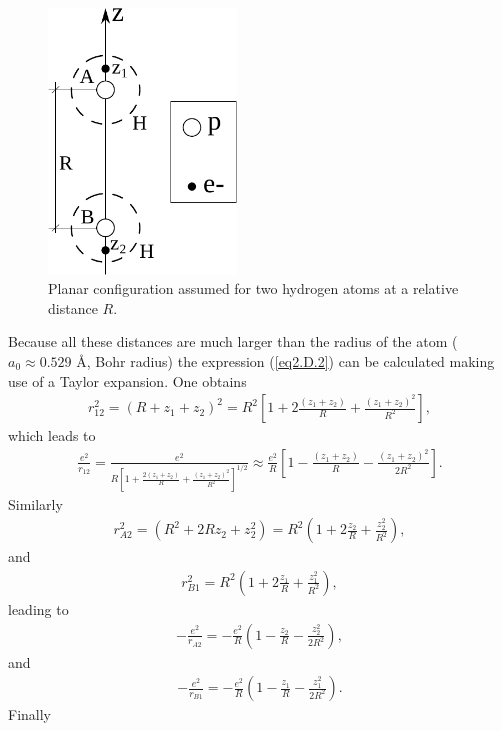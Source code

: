 \begin{subappendices}
    \begin{figure}
     \centerline{\includegraphics*[width=5cm,angle=0]{nutshell/figs/fig2D4_v2.pdf}}
     \caption{Planar configuration assumed for two hydrogen atoms at a relative distance $R$.}\label{fig2.D.4}
     \end{figure}
Because all these distances are much larger than the radius of the atom ($a_0\approx0.529$ \AA, Bohr radius) the expression (\ref{eq2.D.2}) can be calculated making use of a Taylor expansion. One obtains
\begin{align}\label{eq2.D.4}
r_{12}^2=(R+z_1+z_2)^2=R^2\left[1+2\frac{(z_1+z_2)}{R}+\frac{(z_1+z_2)^2}{R^2}\right],
\end{align}
which leads to 
\begin{align}\label{eq2.D.5}
\frac{e^2}{r_{12}}=\frac{e^2}{R\left[1+\frac{2(z_1+z_2)}{R}+\frac{(z_1+z_2)^2}{R^2}\right]^{1/2}}\approx\frac{e^2}{R}\left[1-\frac{(z_1+z_2)}{R}-\frac{(z_1+z_2)^2}{2R^2}\right].
\end{align}
 Similarly
\begin{align}\label{eq2.D.6}
r^2_{A2}=\left(R^2+2Rz_2+z_2^2\right)=R^2\left(1+2\frac{z_2}{R}+\frac{z_2^2}{R^2}\right),
\end{align}
and
\begin{align}\label{eq2.D.7}
r^2_{B1}=R^2\left(1+2\frac{z_1}{R}+\frac{z_1^2}{R^2}\right),
\end{align}
leading to
\begin{align}\label{eq2.D.8}
-\frac{e^2}{r_{A2}}=-\frac{e^2}{R}\left(1-\frac{z_2}{R}-\frac{z_2^2}{2R^2}\right),
\end{align}
and
\begin{align}\label{eq2.D.9}
-\frac{e^2}{r_{B1}}=-\frac{e^2}{R}\left(1-\frac{z_1}{R}-\frac{z_1^2}{2R^2}\right).
\end{align}
Finally
\begin{align}\label{eq2.D.10}

\end{align}
\end{subappendices}

